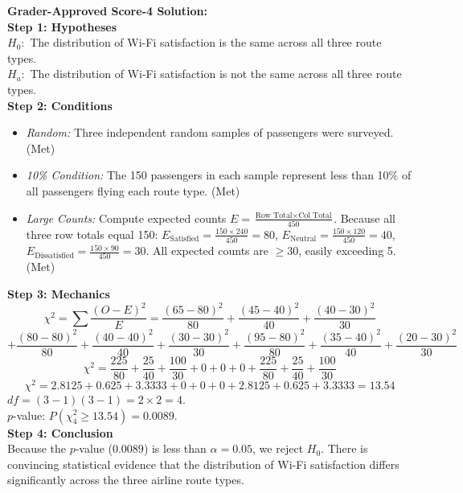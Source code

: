 \begin{frqrubricbox}
\textbf{Grader-Approved Score-4 Solution:}\\
\textbf{Step 1: Hypotheses}\\
$H_0:$ The distribution of Wi-Fi satisfaction is the same across all three route types.\\
$H_a:$ The distribution of Wi-Fi satisfaction is not the same across all three route types.\\
\textbf{Step 2: Conditions}\\
\begin{itemize}
  \item \textit{Random:} Three independent random samples of passengers were surveyed. (Met)
  \item \textit{10\% Condition:} The 150 passengers in each sample represent less than 10\% of all passengers flying each route type. (Met)
  \item \textit{Large Counts:} Compute expected counts $E = \frac{\text{Row Total} \times \text{Col Total}}{450}$. Because all three row totals equal 150:
  $E_{\text{Satisfied}} = \frac{150 \times 240}{450} = 80$, $E_{\text{Neutral}} = \frac{150 \times 120}{450} = 40$, $E_{\text{Dissatisfied}} = \frac{150 \times 90}{450} = 30$.
  All expected counts are $\ge 30$, easily exceeding 5. (Met)
\end{itemize}
\textbf{Step 3: Mechanics}\\
\[ \chi^2 = \sum \frac{(O - E)^2}{E} = \frac{(65-80)^2}{80} + \frac{(45-40)^2}{40} + \frac{(40-30)^2}{30} \]
\[ + \frac{(80-80)^2}{80} + \frac{(40-40)^2}{40} + \frac{(30-30)^2}{30} + \frac{(95-80)^2}{80} + \frac{(35-40)^2}{40} + \frac{(20-30)^2}{30} \]
\[ \chi^2 = \frac{225}{80} + \frac{25}{40} + \frac{100}{30} + 0 + 0 + 0 + \frac{225}{80} + \frac{25}{40} + \frac{100}{30} \]
\[ \chi^2 = 2.8125 + 0.625 + 3.3333 + 0 + 0 + 0 + 2.8125 + 0.625 + 3.3333 = \mathbf{13.54} \]
$df = (3 - 1)(3 - 1) = 2 \times 2 = 4$.\\
$p$-value: $P(\chi_4^2 \ge 13.54) = 0.0089$.\\
\textbf{Step 4: Conclusion}\\
Because the $p$-value ($0.0089$) is less than $\alpha = 0.05$, we reject $H_0$. There is convincing statistical evidence that the distribution of Wi-Fi satisfaction differs significantly across the three airline route types.
\end{frqrubricbox}

